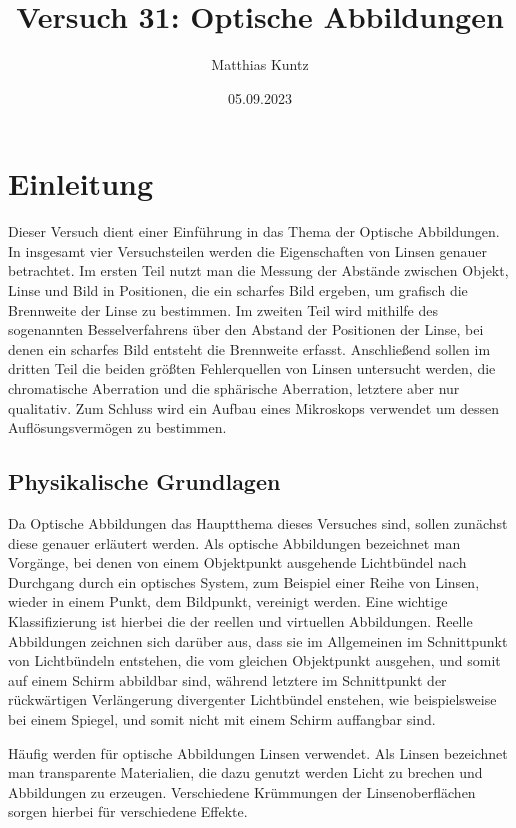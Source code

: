 \documentclass{article}
\title{Versuch 31: Optische Abbildungen}
\author{Matthias Kuntz}
\date{05.09.2023}
\begin{document}
\maketitle

\section{Einleitung}

Dieser Versuch dient einer Einführung in das Thema der Optische Abbildungen. In insgesamt vier Versuchsteilen werden die Eigenschaften von Linsen genauer betrachtet. Im ersten Teil nutzt man die Messung der Abstände zwischen Objekt, Linse und Bild in Positionen, die ein scharfes Bild ergeben, um grafisch die Brennweite der Linse zu bestimmen. Im zweiten Teil wird mithilfe des sogenannten Besselverfahrens über den Abstand der Positionen der Linse, bei denen ein scharfes Bild entsteht die Brennweite erfasst. Anschließend sollen im dritten Teil die beiden größten Fehlerquellen von Linsen untersucht werden, die chromatische Aberration und die sphärische Aberration, letztere aber nur qualitativ. Zum Schluss wird ein Aufbau eines Mikroskops verwendet um dessen Auflösungsvermögen zu bestimmen. 

\subsection{Physikalische Grundlagen}

Da Optische Abbildungen das Hauptthema dieses Versuches sind, sollen zunächst diese genauer erläutert werden. Als optische Abbildungen bezeichnet man Vorgänge, bei denen von einem Objektpunkt ausgehende Lichtbündel nach Durchgang durch ein optisches System, zum Beispiel einer Reihe von Linsen, wieder in einem Punkt, dem Bildpunkt, vereinigt werden. Eine wichtige Klassifizierung ist hierbei die der reellen und virtuellen Abbildungen. Reelle Abbildungen zeichnen sich darüber aus, dass sie im Allgemeinen im Schnittpunkt von Lichtbündeln entstehen, die vom gleichen Objektpunkt ausgehen, und somit auf einem Schirm abbildbar sind, während letztere im Schnittpunkt der rückwärtigen Verlängerung divergenter Lichtbündel enstehen, wie beispielsweise bei einem Spiegel, und somit nicht mit einem Schirm auffangbar sind.

Häufig werden für optische Abbildungen Linsen verwendet. Als Linsen bezeichnet man transparente Materialien, die dazu genutzt werden Licht zu brechen und Abbildungen zu erzeugen. Verschiedene Krümmungen der Linsenoberflächen sorgen hierbei für verschiedene Effekte. 
\end{document}
